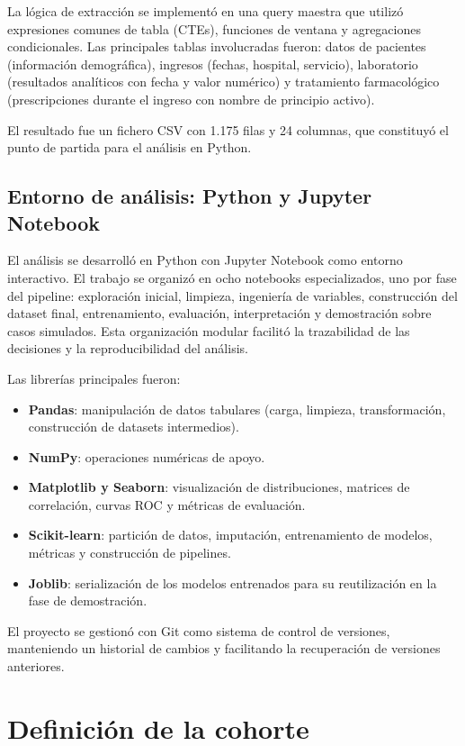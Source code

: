 \documentclass[12pt, a4paper, oneside]{report}
\begin{document}
La lógica de extracción se implementó en una query maestra que utilizó expresiones comunes de tabla (CTEs), funciones de ventana y agregaciones condicionales. Las principales tablas involucradas fueron: datos de pacientes (información demográfica), ingresos (fechas, hospital, servicio), laboratorio (resultados analíticos con fecha y valor numérico) y tratamiento farmacológico (prescripciones durante el ingreso con nombre de principio activo).

El resultado fue un fichero CSV con 1.175 filas y 24 columnas, que constituyó el punto de partida para el análisis en Python.

\subsection{Entorno de análisis: Python y Jupyter Notebook}

El análisis se desarrolló en Python con Jupyter Notebook como entorno interactivo. El trabajo se organizó en ocho notebooks especializados, uno por fase del pipeline: exploración inicial, limpieza, ingeniería de variables, construcción del dataset final, entrenamiento, evaluación, interpretación y demostración sobre casos simulados. Esta organización modular facilitó la trazabilidad de las decisiones y la reproducibilidad del análisis.

Las librerías principales fueron:

\begin{itemize}
    \item \textbf{Pandas}: manipulación de datos tabulares (carga, limpieza, transformación, construcción de datasets intermedios).
    \item \textbf{NumPy}: operaciones numéricas de apoyo.
    \item \textbf{Matplotlib y Seaborn}: visualización de distribuciones, matrices de correlación, curvas ROC y métricas de evaluación.
    \item \textbf{Scikit-learn}: partición de datos, imputación, entrenamiento de modelos, métricas y construcción de pipelines.
    \item \textbf{Joblib}: serialización de los modelos entrenados para su reutilización en la fase de demostración.
\end{itemize}

El proyecto se gestionó con Git como sistema de control de versiones, manteniendo un historial de cambios y facilitando la recuperación de versiones anteriores.

\section{Definición de la cohorte}
\end{document}
